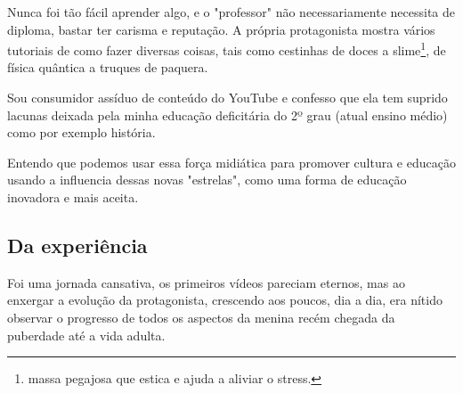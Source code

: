 Nunca foi tão fácil aprender algo, e o "professor"  não necessariamente necessita de diploma, bastar ter carisma e reputação. A própria protagonista mostra vários tutoriais de como fazer diversas coisas, tais como cestinhas de doces a slime\footnote{ massa pegajosa que estica e ajuda a aliviar o stress.}, de física quântica a truques de paquera.

Sou consumidor assíduo de conteúdo do YouTube e confesso que ela tem suprido lacunas deixada pela minha educação deficitária do 2º grau (atual ensino médio) como por exemplo história.

Entendo que podemos usar essa força midiática para promover cultura e educação usando a influencia dessas novas "estrelas", como uma forma de educação inovadora e mais aceita.

\subsection{Da experiência}

Foi uma jornada cansativa, os primeiros vídeos pareciam eternos, mas ao enxergar a evolução da protagonista, crescendo aos poucos, dia a dia, era nítido observar o progresso de todos os aspectos da menina recém chegada da puberdade até a vida adulta.